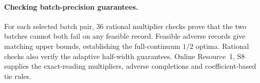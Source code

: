 \paragraph{Checking batch-precision guarantees.}
For each selected batch pair, 36 rational multiplier checks prove that the
two batches cannot both fail on any feasible record. Feasible adverse
records give matching upper bounds, establishing the full-continuum $1/2$
optima. Rational checks also verify the adaptive half-width guarantees.
Online Resource~1, S8 supplies the exact-reading multipliers, adverse
completions and coefficient-based tie rules.
